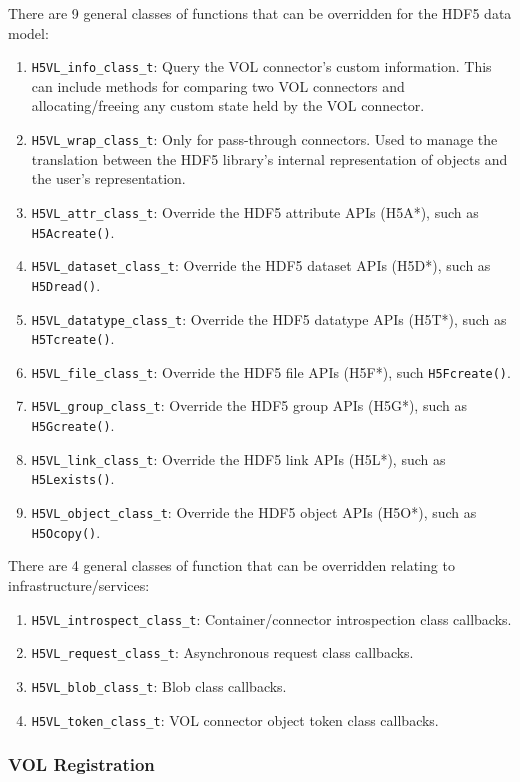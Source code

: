 There are 9 general classes of functions that can be overridden for the HDF5 data model:
\begin{enumerate}
    \item \texttt{H5VL\_info\_class\_t}: Query the VOL connector's custom information. This can include methods for comparing two VOL connectors and allocating/freeing any custom state held by the VOL connector.
    \item \texttt{H5VL\_wrap\_class\_t}: Only for pass-through connectors. Used to manage the translation between the HDF5 library's internal representation of objects and the user's representation.
    \item \texttt{H5VL\_attr\_class\_t}: Override the HDF5 attribute APIs (H5A*), such as \texttt{H5Acreate()}.
    \item \texttt{H5VL\_dataset\_class\_t}: Override the HDF5 dataset APIs (H5D*), such as \texttt{H5Dread()}.
    \item \texttt{H5VL\_datatype\_class\_t}: Override the HDF5 datatype APIs (H5T*), such as \texttt{H5Tcreate()}.
    \item \texttt{H5VL\_file\_class\_t}: Override the HDF5 file APIs (H5F*), such \texttt{H5Fcreate()}.
    \item \texttt{H5VL\_group\_class\_t}: Override the HDF5 group APIs (H5G*), such as \texttt{H5Gcreate()}.
    \item \texttt{H5VL\_link\_class\_t}: Override the HDF5 link APIs (H5L*), such as \texttt{H5Lexists()}.
    \item \texttt{H5VL\_object\_class\_t}: Override the HDF5 object APIs (H5O*), such as \texttt{H5Ocopy()}.
\end{enumerate}

There are 4 general classes of function that can be overridden relating to infrastructure/services:
\begin{enumerate}
    \item \texttt{H5VL\_introspect\_class\_t}: Container/connector introspection class callbacks.
    \item \texttt{H5VL\_request\_class\_t}: Asynchronous request class callbacks.
    \item \texttt{H5VL\_blob\_class\_t}: Blob class callbacks.
    \item \texttt{H5VL\_token\_class\_t}: VOL connector object token class callbacks.
\end{enumerate}

\subsubsection{VOL Registration}

